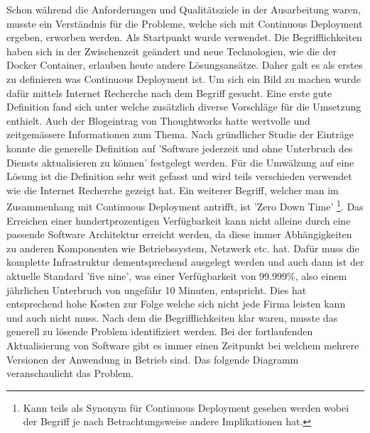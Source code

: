 Schon während die Anforderungen und Qualitätsziele in der Ausarbeitung waren, musste ein Verständnis für die Probleme, welche sich mit Continuous Deployment ergeben, erworben werden. Als Startpunkt wurde \cite{cd} verwendet. Die Begrifflichkeiten haben sich in der Zwischenzeit geändert und neue Technologien, wie die der Docker Container, erlauben heute andere Lösungsansätze. Daher galt es als erstes zu definieren was Continuous Deployment ist. Um sich ein Bild zu machen wurde dafür mittels Internet Recherche nach dem Begriff gesucht. Eine erste gute Definition fand sich unter \cite{atlassiancd} welche zusätzlich diverse Vorschläge für die Umsetzung enthielt. Auch der Blogeintrag von Thoughtworks \cite{thoughtcd} hatte wertvolle und zeitgemässere Informationen zum Thema. Nach gründlicher Studie der Einträge konnte die generelle Definition auf 'Software jederzeit und ohne Unterbruch des Diensts aktualisieren zu können' festgelegt werden. Für die Umwälzung auf eine Lösung ist die Definition sehr weit gefasst und wird teils verschieden verwendet wie die Internet Recherche gezeigt hat. Ein weiterer Begriff, welcher man im Zusammenhang mit Continuous Deployment antrifft, ist 'Zero Down Time' \footnote{Kann teils als Synonym für Continuous Deployment gesehen werden wobei der Begriff je nach Betrachtungsweise andere Implikationen hat.}. Das Erreichen einer hundertprozentigen Verfügbarkeit kann nicht alleine durch eine passende Software Architektur erreicht werden, da diese immer Abhängigkeiten zu anderen Komponenten wie Betriebssystem, Netzwerk etc. hat. Dafür muss die komplette Infrastruktur dementsprechend ausgelegt werden und auch dann ist der aktuelle Standard 'five nine', was einer Verfügbarkeit von 99.999\%, also einem jährlichen Unterbruch von ungefähr 10 Minuten, entspricht. Dies hat entsprechend hohe Kosten zur Folge welche sich nicht jede Firma leisten kann und auch nicht muss.\newline
Nach dem die Begrifflichkeiten klar waren, musste das generell zu lösende Problem identifiziert werden. Bei der fortlaufenden Aktualisierung von Software gibt es immer einen Zeitpunkt bei welchem mehrere Versionen der Anwendung in Betrieb sind. Das folgende Diagramm veranschaulicht das Problem.


